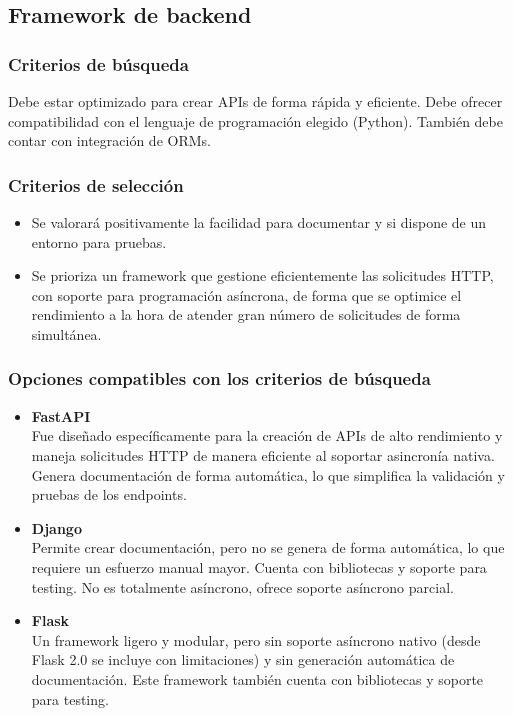 \subsection{Framework de backend}
\subsubsection{Criterios de búsqueda}
Debe estar optimizado para crear APIs de forma rápida y eficiente.
Debe ofrecer compatibilidad con el lenguaje de programación elegido (Python). También debe contar con integración de ORMs.

\subsubsection{Criterios de selección}
\begin{itemize}
    \item Se valorará positivamente la facilidad para documentar y si dispone de un entorno para pruebas.
    \item Se prioriza un framework que gestione eficientemente las solicitudes HTTP, con soporte para programación asíncrona, de forma que se optimice el rendimiento a la hora de atender gran número de solicitudes de forma simultánea.
\end{itemize}

\subsubsection{Opciones compatibles con los criterios de búsqueda}
\begin{itemize}
    \item \textbf{FastAPI}\\
        Fue diseñado específicamente para la creación de APIs de alto rendimiento y maneja solicitudes HTTP de manera eficiente al soportar asincronía nativa.
        Genera documentación de forma automática, lo que simplifica la validación y pruebas de los endpoints.
    \item \textbf{Django}\\
        Permite crear documentación, pero no se genera de forma automática, lo que requiere un esfuerzo manual mayor. 
        Cuenta con bibliotecas y soporte para testing. No es totalmente asíncrono, ofrece soporte asíncrono parcial.
    \item \textbf{Flask}\\
        Un framework ligero y modular, pero sin soporte asíncrono nativo (desde Flask 2.0 se incluye con limitaciones) y sin generación automática de documentación. Este framework también cuenta con bibliotecas y soporte para testing.    
\end{itemize}

